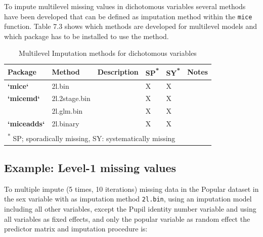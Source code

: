\documentclass[
]{book}
\newenvironment{Shaded}{\begin{snugshade}}{\end{snugshade}}
\newcommand{\AttributeTok}[1]{\textcolor[rgb]{0.77,0.63,0.00}{#1}}
\newcommand{\CommentTok}[1]{\textcolor[rgb]{0.56,0.35,0.01}{\textit{#1}}}
\newcommand{\DecValTok}[1]{\textcolor[rgb]{0.00,0.00,0.81}{#1}}
\newcommand{\FunctionTok}[1]{\textcolor[rgb]{0.00,0.00,0.00}{#1}}
\newcommand{\NormalTok}[1]{#1}
\newcommand{\OtherTok}[1]{\textcolor[rgb]{0.56,0.35,0.01}{#1}}
\newcommand{\SpecialCharTok}[1]{\textcolor[rgb]{0.00,0.00,0.00}{#1}}
\newcommand{\StringTok}[1]{\textcolor[rgb]{0.31,0.60,0.02}{#1}}
\begin{document}
To impute multilevel missing values in dichotomous variables several methods have been developed that can be defined as imputation method within the \texttt{mice} function. Table 7.3 shows which methods are developed for multilevel models and which package has to be installed to use the method.

\begin{table}

\caption{\label{tab:unnamed-chunk-115}Multilevel Imputation methods for dichotomous variables}
\centering
\begin{tabular}[t]{>{}l||>{}l||>{\raggedright\arraybackslash}p{20em}|>{}l||>{}l||>{\raggedright\arraybackslash}p{30em}}
\hline
Package & Method & Description & SP\textsuperscript{*} & SY\textsuperscript{*} & Notes\\
\hline
\textbf{`mice`} & 2l.bin & \cellcolor{white}{Generalized Linear Mixed model} & X & X & \cellcolor{white}{20-50 iterations are recommended and may be hard to run in small datasets}\\
\hline
\textbf{`micemd`} & 2l.2stage.bin & \cellcolor{white}{Generalized Linear Mixed model} & X & X & \cellcolor{white}{}\\
\hline
\textbf{} & 2l.glm.bin & \cellcolor{white}{Two-level model} & X & X & \cellcolor{white}{}\\
\hline
\textbf{`miceadds`} & 2l.binary & \cellcolor{white}{Generalized Linear Mixed model} & X & X & \cellcolor{white}{}\\
\hline
\multicolumn{6}{l}{\rule{0pt}{1em}\textsuperscript{*} SP; sporadically missing, SY: systematically missing}\\
\end{tabular}
\end{table}

\hypertarget{example-level-1-missing-values-1}{%
\subsection{Example: Level-1 missing values}\label{example-level-1-missing-values-1}}

To multiple impute (5 times, 10 iterations) missing data in the Popular dataset in the sex variable with as imputation method \texttt{2l.bin}, using an imputation model including all other variables, except the Pupil identity number variable and using all variables as fixed effects, and only the popular variable as random effect the predictor matrix and imputation procedure is:

\begin{Shaded}
\end{Shaded}
\end{document}
